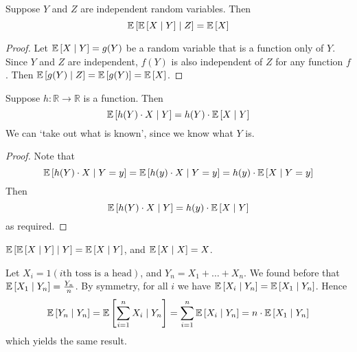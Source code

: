 \begin{proposition}
	Suppose \(Y\) and \(Z\) are independent random variables.
	Then
	\[
		\mathbb{E}\left[{\mathbb{E}\left[{X \mid Y}\right] \mid Z}\right] = \mathbb{E}\left[{X}\right]
	\]
\end{proposition}
\begin{proof}
	Let \(\mathbb{E}\left[{X \mid Y}\right] = g(Y)\) be a random variable that is a function only of \(Y\).
	Since \(Y\) and \(Z\) are independent, \(f(Y)\) is also independent of \(Z\) for any function \(f\).
	Then \(\mathbb{E}\left[{g(Y) \mid Z}\right] = \mathbb{E}\left[{g(Y)}\right] = \mathbb{E}\left[{X}\right]\).
\end{proof}
\begin{proposition}
	Suppose \(h \colon \mathbb R \to \mathbb R\) is a function.
	Then
	\[
		\mathbb{E}\left[{h(Y) \cdot X \mid Y}\right] = h(Y) \cdot \mathbb{E}\left[{X \mid Y}\right]
	\]
	We can `take out what is known', since we know what \(Y\) is.
\end{proposition}
\begin{proof}
	Note that
	\[
		\mathbb{E}\left[{h(Y) \cdot X \mid Y = y}\right] = \mathbb{E}\left[{h(y) \cdot X \mid Y = y}\right] = h(y) \cdot \mathbb{E}\left[{X \mid Y = y}\right]
	\]
	Then
	\[
		\mathbb{E}\left[{h(Y) \cdot X \mid Y}\right] = h(y) \cdot \mathbb{E}\left[{X \mid Y}\right]
	\]
	as required.
\end{proof}
\begin{corollary}
	\(\mathbb{E}\left[{\mathbb{E}\left[{X \mid Y}\right] \mid Y}\right] = \mathbb{E}\left[{X \mid Y}\right]\), and \(\mathbb{E}\left[{X \mid X}\right] = X\).
\end{corollary}
Let \(X_i = 1(i\text{th toss is a head})\), and \(Y_n = X_1 + \dots + X_n\).
We found before that \(\mathbb{E}\left[{X_1 \mid Y_n}\right] = \frac{Y_n}{n}\).
By symmetry, for all \(i\) we have \(\mathbb{E}\left[{X_i \mid Y_n}\right] = \mathbb{E}\left[{X_1 \mid Y_n}\right]\).
Hence
\[
	\mathbb{E}\left[{Y_n \mid Y_n}\right] = \mathbb{E}\left[{\sum_{i=1}^n X_i \mid Y_n}\right] = \sum_{i=1}^n \mathbb{E}\left[{X_i \mid Y_n}\right] = n \cdot \mathbb{E}\left[{X_1 \mid Y_n}\right]
\]
which yields the same result.
